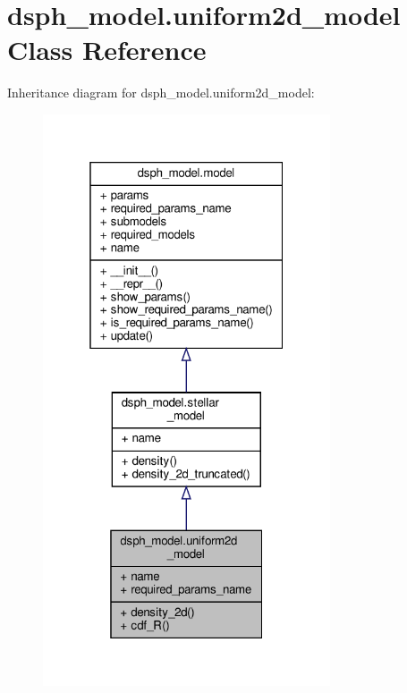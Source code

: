 \hypertarget{classdsph__model_1_1uniform2d__model}{}\section{dsph\+\_\+model.\+uniform2d\+\_\+model Class Reference}
\label{classdsph__model_1_1uniform2d__model}


Inheritance diagram for dsph\+\_\+model.\+uniform2d\+\_\+model\+:\nopagebreak
\begin{figure}[H]
\begin{center}
\leavevmode
\includegraphics[width=241pt]{d2/dd9/classdsph__model_1_1uniform2d__model__inherit__graph}
\end{center}
\end{figure}


